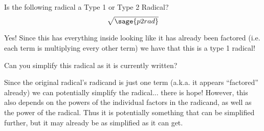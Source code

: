 \documentclass{ximera}
\begin{document}
\begin{problem}
    Is the following radical a Type 1 or Type 2 Radical?
    \[
        \sqrt{\sage{p2rad}}
    \]
    
    \begin{multipleChoice}
    \end{multipleChoice}
    \begin{feedback}[correct]
        Yes! Since this has everything inside looking like it has already been factored (i.e. each term is multiplying every other term) we have that this is a type 1 radical!
    \end{feedback}
    
    \begin{problem}
        Can you simplify this radical as it is currently written?
        \begin{multipleChoice}
        \end{multipleChoice}
        \begin{feedback}[correct]
            Since the original radical's radicand is just one term (a.k.a. it appears ``factored'' already) we can potentially simplify the radical... there is hope! However, this also depends on the powers of the individual factors in the radicand, as well as the power of the radical. Thus it is potentially something that can be simplified further, but it may already be as simplified as it can get. 
        \end{feedback}
    \end{problem}
\end{problem}
\end{document}
